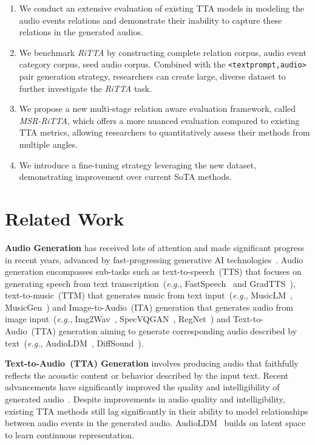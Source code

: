 \vspace{-2mm}
\begin{enumerate}[leftmargin=*]
    \item We conduct an extensive evaluation of existing TTA models in modeling the audio events relations and demonstrate their inability to capture these relations in the generated audios.
    \item We benchmark \emph{RiTTA} by constructing complete relation corpus, audio event category corpus, seed audio corpus. Combined with the \texttt{<textprompt,audio>} pair generation strategy, researchers can create large, diverse dataset to further investigate the \emph{RiTTA} task.
    \item We propose a new multi-stage relation aware evaluation framework, called \emph{MSR-RiTTA}, which offers a more nuanced evaluation compared to existing TTA metrics, allowing researchers to quantitatively assess their methods from multiple angles.
    \item We introduce a fine-tuning strategy leveraging the new dataset, demonstrating improvement over current SoTA methods. 
\end{enumerate}\vspace{-3mm}
\section{Related Work}
\vspace{-3mm}

\textbf{Audio Generation} has received lots of attention and made significant progress in recent years, advanced by fast-progressing generative AI technologies~\citep{ho2020denoising,stable_diffusion}. Audio generation encompasses sub-tasks such as text-to-speech~(TTS) that focuses on generating speech from text transcription~(\textit{e.g.}, FastSpeech~\citep{fast_speech} and GradTTS~\citep{grad_tts}), text-to-music~(TTM) that generates music from text input~(\textit{e.g.}, MusicLM~\citep{musicLM}, MusicGen~\citep{musicGEN}) and Image-to-Audio~(ITA) generation that generates audio from image input~(\textit{e.g.}, Img2Wav~\citep{img2wav}, SpecVQGAN~\citep{SpecVQGAN_Iashin_2021}, RegNet~\citep{chen2020regnet}) and Text-to-Audio~(TTA) generation aiming to generate corresponding audio described by text~(\textit{e.g.}, AudioLDM~\citep{audioldm2,liu2023audioldm,yang2022diffsound}, DiffSound~\citep{yang2022diffsound}).

\textbf{Text-to-Audio~(TTA) Generation} involves producing audio that faithfully reflects the acoustic content or behavior described by the input text. Recent advancements have significantly improved the quality and intelligibility of generated audio~\citep{audioldm2,liu2023audioldm,kreuk2022audiogen,yang2022diffsound,ghosal2023tango,liao2024baton}. Despite improvements in audio quality and intelligibility, existing TTA methods still lag significantly in their ability to model relationships between audio events in the generated audio. AudioLDM~\citep{liu2023audioldm} builds on latent space~\citep{stable_diffusion} to learn continuous representation.

